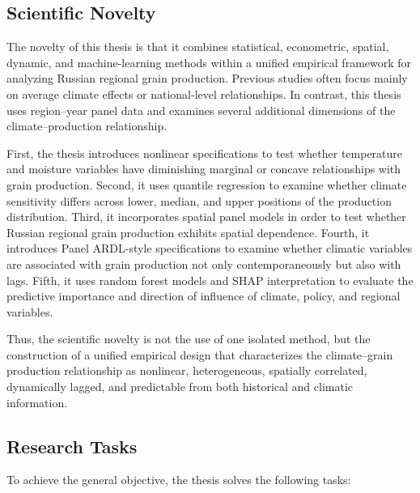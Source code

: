 \documentclass[12pt,a4paper]{article}
\begin{document}
\subsection{Scientific Novelty}

The novelty of this thesis is that it combines statistical, econometric, spatial, dynamic, and machine-learning methods within a unified empirical framework for analyzing Russian regional grain production. Previous studies often focus mainly on average climate effects or national-level relationships. In contrast, this thesis uses region--year panel data and examines several additional dimensions of the climate--production relationship.

First, the thesis introduces nonlinear specifications to test whether temperature and moisture variables have diminishing marginal or concave relationships with grain production. Second, it uses quantile regression to examine whether climate sensitivity differs across lower, median, and upper positions of the production distribution. Third, it incorporates spatial panel models in order to test whether Russian regional grain production exhibits spatial dependence. Fourth, it introduces Panel ARDL-style specifications to examine whether climatic variables are associated with grain production not only contemporaneously but also with lags. Fifth, it uses random forest models and SHAP interpretation to evaluate the predictive importance and direction of influence of climate, policy, and regional variables.

Thus, the scientific novelty is not the use of one isolated method, but the construction of a unified empirical design that characterizes the climate--grain production relationship as nonlinear, heterogeneous, spatially correlated, dynamically lagged, and predictable from both historical and climatic information.

\subsection{Research Tasks}

To achieve the general objective, the thesis solves the following tasks:
\end{document}
